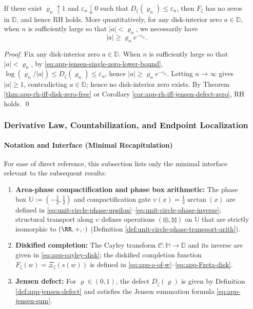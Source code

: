 \begin{corollary}\label{cor:app-jensen-defect-upperbound-certificate}
If there exist \(\varrho_n\uparrow 1\) and \(\varepsilon_n\downarrow 0\) such that \(D_{\zeta}(\varrho_n)\le \varepsilon_n\), then \(F_{\zeta}\) has no zeros in \(\mathbb{D}\), and hence RH holds.
More quantitatively, for any disk-interior zero \(a\in\mathbb{D}\), when \(n\) is sufficiently large so that \(|a|<\varrho_n\), we necessarily have
\[
|a|\ge \varrho_n e^{-\varepsilon_n}.
\]
\end{corollary}
\begin{proof}
Fix any disk-interior zero \(a\in\mathbb{D}\).
When \(n\) is sufficiently large so that \(|a|<\varrho_n\), by \eqref{eq:app-jensen-single-zero-lower-bound},
\(
\log(\varrho_n/|a|)\le D_{\zeta}(\varrho_n)\le \varepsilon_n
\), hence \(|a|\ge \varrho_n e^{-\varepsilon_n}\).
Letting \(n\to\infty\) gives \(|a|\ge 1\), contradicting \(a\in\mathbb{D}\); hence no disk-interior zero exists.
By Theorem \ref{thm:app-rh-iff-disk-zero-free} or Corollary \ref{cor:app-rh-iff-jensen-defect-zero}, RH holds. \qed
\end{proof}

\subsubsection{Derivative Law, Countabilization, and Endpoint Localization}\label{subsubsec:app-jensen-defect-new-cluster}

\paragraph{Notation and Interface (Minimal Recapitulation)}
For ease of direct reference, this subsection lists only the minimal interface relevant to the subsequent results:
\begin{enumerate}
  \item \textbf{Area-phase compactification and phase box arithmetic:} The phase box \(\mathbb{U}:=(-\tfrac12,\tfrac12)\) and compactification gate \(\upsilon(x)=\frac{1}{\pi}\arctan(x)\) are defined in \eqref{eq:unit-circle-phase-upsilon}--\eqref{eq:unit-circle-phase-inverse};
  structural transport along \(\upsilon\) defines operations \((\boxplus,\boxtimes)\) on \(\mathbb{U}\) that are strictly isomorphic to \((\RR,+,\cdot)\) (Definition \ref{def:unit-circle-phase-transport-arith}).
  \item \textbf{Diskified completion:} The Cayley transform \(\mathcal{C}:\mathbb{H}\to\mathbb{D}\) and its inverse are given in \eqref{eq:app-cayley-disk};
  the diskified completion function \(F_{\zeta}(w)=\Xi_{\zeta}(s(w))\) is defined in \eqref{eq:app-s-of-w}--\eqref{eq:app-Fzeta-disk}.
  \item \textbf{Jensen defect:} For \(\varrho\in(0,1)\), the defect \(D_{\zeta}(\varrho)\) is given by Definition \ref{def:app-jensen-defect} and satisfies the Jensen summation formula \eqref{eq:app-jensen-sum}.
\end{enumerate}

